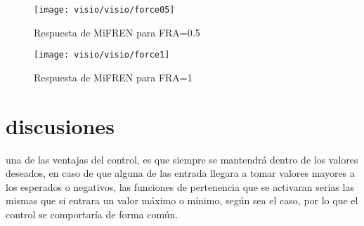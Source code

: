 \begin{figure}[h]
	\centering
	\texttt{[image: visio/visio/force05]}
		\caption{Respuesta de MiFREN para FRA=0.5}
	\label{fig:force0}
\end{figure}

\begin{figure}[h]
	\centering
	\texttt{[image: visio/visio/force1]}
	\caption{Respuesta de MiFREN para FRA=1}
	\label{fig:force1}
\end{figure}

\section{discusiones}

una de las ventajas del control, es que siempre se mantendrá dentro de los valores deseados, en caso de que alguna de las entrada llegara a tomar valores mayores a los esperados o negativos, las funciones de pertenencia que se activaran serias las mismas que si entrara un valor máximo o mínimo, según sea el caso, por lo que el control se comportaría de forma común.


